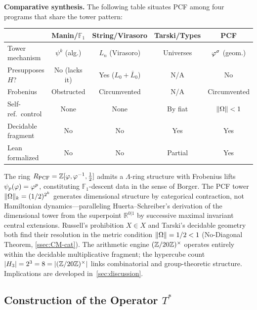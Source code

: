 \textbf{Comparative synthesis.}
The following table situates PCF among four programs that share the tower
pattern:

\begin{center}
\small
\begin{tabular}{@{}lcccc@{}}
\toprule
 & \textbf{Manin/$\mathbb{F}_1$} & \textbf{String/Virasoro}
 & \textbf{Tarski/Types} & \textbf{PCF} \\
\midrule
Tower mechanism & $\psi^k$ (alg.) & $L_n$ (Virasoro)
  & Universes & $\varphi^\sigma$ (geom.) \\
Presupposes $H$? & No (lacks it) & Yes ($L_0{+}\bar{L}_0$)
  & N/A & No \\
Frobenius & Obstructed & Circumvented
  & N/A & Circumvented \\
Self-ref.\ control & None & None & By fiat & $\|\Omega\|<1$ \\
Decidable fragment & No & No & Yes & Yes \\
Lean formalized & No & No & Partial & Yes \\
\bottomrule
\end{tabular}
\end{center}

The ring $R_{\mathrm{PCF}} = \mathbb{Z}[\varphi,\varphi^{-1},\tfrac{1}{2}]$ admits a
$\Lambda$-ring structure with Frobenius lifts $\psi_p(\varphi)=\varphi^p$,
constituting $\mathbb{F}_1$-descent data in the sense of Borger.  The PCF
tower $\|\Omega\|_k = (1/2)^{2^k}$ generates dimensional structure by
categorical contraction, not Hamiltonian dynamics---paralleling
Huerta--Schreiber's derivation of the dimensional tower from the superpoint
$\mathbb{R}^{0|1}$ by successive maximal invariant central extensions.
Russell's prohibition $X\in X$ and Tarski's decidable geometry both find
their resolution in the metric condition $\|\Omega\|=1/2<1$ (No-Diagonal
Theorem, \cref{ssec:CM-cat}).  The arithmetic engine $(\mathbb{Z}/20\mathbb{Z})^\times$ operates
entirely within the decidable multiplicative fragment; the hypercube count
$|H_3| = 2^3 = 8 = |(\mathbb{Z}/20\mathbb{Z})^\times|$ links combinatorial and group-theoretic
structure.
Implications are developed in~\cref{sec:discussion}.


\subsection{Construction of the Operator \texorpdfstring{$T^*$}{T*}}\label{ssec:Tstar}

